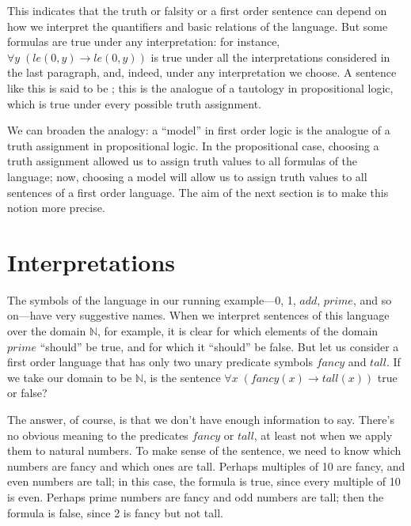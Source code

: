 \documentclass[letterpaper,10pt,english]{sphinxmanual}
\begin{document}
\sphinxAtStartPar
This indicates that the truth or falsity or a first order sentence can depend on how we interpret the quantifiers and basic relations of the language. But some formulas are true under any interpretation: for instance, \(\forall y \; (\mathit{le}(0, y) \to \mathit{le}(0, y))\) is true under all the interpretations considered in the last paragraph, and, indeed, under any interpretation we choose. A sentence like this is said to be ; this is the analogue of a tautology in propositional logic, which is true under every possible truth assignment.

\sphinxAtStartPar
We can broaden the analogy: a “model” in first order logic is the analogue of a truth assignment in propositional logic. In the propositional case, choosing a truth assignment allowed us to assign truth values to all formulas of the language; now, choosing a model will allow us to assign truth values to all sentences of a first order language. The aim of the next section is to make this notion more precise.


\section{Interpretations}
\label{\detokenize{semantics_of_first_order_logic:interpretations}}
\sphinxAtStartPar
The symbols of the language in our running example—0, 1, \(\mathit{add}\), \(\mathit{prime}\), and so on—have very suggestive names. When we interpret sentences of this language over the domain \({\mathbb N}\), for example, it is clear for which elements of the domain \(\mathit{prime}\) “should” be true, and for which it “should” be false. But let us consider a first order language that has only two unary predicate symbols \(\mathit{fancy}\) and \(\mathit{tall}\). If we take our domain to be \({\mathbb N}\), is the sentence \(\forall x \; (\mathit{fancy}(x) \to \mathit{tall}(x))\) true or false?

\sphinxAtStartPar
The answer, of course, is that we don’t have enough information to say. There’s no obvious meaning to the predicates \(\mathit{fancy}\) or \(\mathit{tall}\), at least not when we apply them to natural numbers. To make sense of the sentence, we need to know which numbers are fancy and which ones are tall. Perhaps multiples of 10 are fancy, and even numbers are tall; in this case, the formula is true, since every multiple of 10 is even. Perhaps prime numbers are fancy and odd numbers are tall; then the formula is false, since 2 is fancy but not tall.
\end{document}
